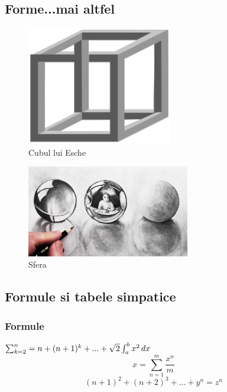 \documentclass{article}
\begin{document}
\clearpage{}

\subsection{Forme...mai altfel}
\hfill\break
\hfill\break
\hfill\break
\hfill\break
\begin{figure}[h]
\begin{center}
\includegraphics[width=2.5in]{Cube}
\end{center}
\caption{Cubul lui Esche}
\label{Fig.1:}
\end{figure}
\hfill\break
\hfill\break
\begin{figure}[h]
\begin{center}
\includegraphics[width=2.8in]{Sfera}
\end{center}
\caption{Sfera}
\label{Fig.2}
\end{figure}


\clearpage{}
\subsection{Formule si tabele simpatice}
\hfill\break
\subsubsection{Formule}
\hfill\break
\hfill\break
\begin{math}
\sum_{k=2}^n = n + (n+1)^k +...+\sqrt{2}\\ 
\hfill\break
\hfill\break
\int_{a}^{b} x^2 \,dx \ 
\end{math}
\hfill\break
\begin{equation}
\label{Fractie}
 x=\sum_{n=1}^{m}  \frac{x^n}{m}
\end{equation}
\hfill\break
\hfill\break
\[ (n+1)^2 + (n+2)^3+...+y^n = z^n \]
\hfill\break
\hfill\break
\end{document}
